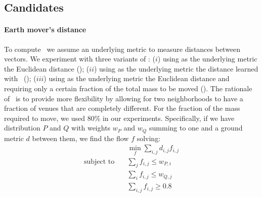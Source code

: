 \subsection{Candidates}

\paragraph{Earth mover's distance}
To compute \emd\ we assume an underlying metric to measure
distances between vectors.
We experiment with three variants of \emd:
($i$) using as the underlying metric the Euclidean distance (\emde); 
($ii$) using as the underlying metric the distance learned with \lmnn\ (\emdl); 
($iii$) using as the underlying metric the Euclidean distance and
requiring only a certain fraction of the total mass to be moved
(\emdp).
The rationale of \emdp\ is to provide more flexibility by allowing for two
neighborhoods to have a fraction of venues that are completely different.  For
the fraction of the mass required to move, we used 80\% in our experiments.
Specifically, if we have distribution $P$ and $Q$ with weights $w_P$ and $w_Q$
summing to one and a ground metric $d$ between them, we find the flow $f$
solving:
\begin{align*}
	&\quad \underset{f}{\min} \sum_{i,j} d_{i,j} f_{i,j} \\
	\text{subject to} &\quad \sum_j f_{i,j} \leq w_{P,i} \\
	&\quad \sum_i f_{i,j} \leq w_{Q,j} \\
	&\quad \sum_{i,j} f_{i,j} \geq 0.8 
\end{align*}

